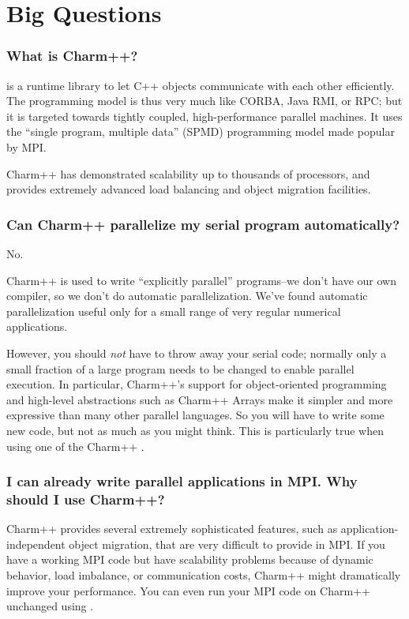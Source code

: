\section{Big Questions}

\subsubsection{What is Charm++?}

 is
a runtime library to let C++ objects communicate with each other efficiently.
The programming model is thus very much like CORBA, Java RMI, or RPC; but
it is targeted towards tightly coupled, high-performance parallel machines.
It uses the ``single program, multiple data'' (SPMD) programming model made
popular by MPI.

Charm++ has demonstrated scalability up to thousands of processors,
and provides extremely advanced load balancing and object migration facilities.

\subsubsection{Can Charm++ parallelize my serial program automatically?}

No.

Charm++ is used to write ``explicitly parallel'' programs--we don't have
our own compiler, so we don't do automatic parallelization. We've found
automatic parallelization useful only for a small range of very regular
numerical applications.

However, you should { \em not} have to throw away your serial code;
normally only a small fraction of a large program needs to be changed to
enable parallel execution. In particular, Charm++'s support for object-oriented
programming and high-level abstractions such as Charm++ Arrays make it
simpler and more expressive than many other parallel languages. So you
will have to write some new code, but not as much as you might think. This
is particularly true when using one of the Charm++ .

\subsubsection{I can already write parallel applications in MPI. Why should I use Charm++?}

Charm++ provides several extremely sophisticated features, such as
application-independent object migration, that are very difficult to provide
in MPI. If you have a working MPI code but have scalability problems
because of dynamic behavior, load imbalance, or communication costs, Charm++
might dramatically improve your performance. You can even run your
MPI code on Charm++ unchanged using .


